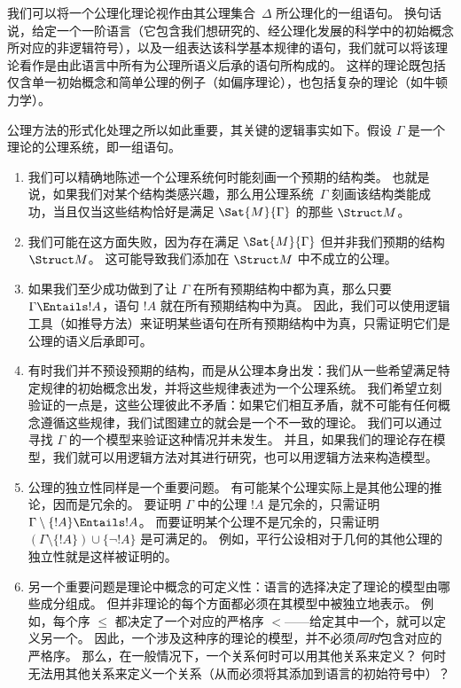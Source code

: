 \documentclass[../../../include/open-logic-section]{subfiles}
\begin{document}
\begin{explain}
我们可以将一个公理化理论视作由其公理集合~$\Delta$ 所公理化的一组语句。
换句话说，给定一个一阶语言（它包含我们想研究的、经公理化发展的科学中的初始概念所对应的非逻辑符号），以及一组表达该科学基本规律的语句，我们就可以将该理论看作是由此语言中所有为公理所语义后承的语句所构成的。
这样的理论既包括仅含单一初始概念和简单公理的例子（如偏序理论），也包括复杂的理论（如牛顿力学）。

公理方法的形式化处理之所以如此重要，其关键的逻辑事实如下。假设 $\Gamma$ 是一个理论的公理系统，即一组语句。
\begin{enumerate}
\item 我们可以精确地陈述一个公理系统何时能刻画一个预期的结构类。
也就是说，如果我们对某个结构类感兴趣，那么用公理系统~$\Gamma$ 刻画该结构类能成功，当且仅当这些结构恰好是满足 $\Sat{M}{\Gamma}$ 的那些 $\Struct M$。
\item 我们可能在这方面失败，因为存在满足 $\Sat{M}{\Gamma}$ 但并非我们预期的结构 $\Struct M$。
这可能导致我们添加在 $\Struct M$ 中不成立的公理。
\item 如果我们至少成功做到了让 $\Gamma$ 在所有预期结构中都为真，那么只要 $\Gamma \Entails !A$，语句 $!A$ 就在所有预期结构中为真。
因此，我们可以使用逻辑工具（如推导方法）来证明某些语句在所有预期结构中为真，只需证明它们是公理的语义后承即可。
\item 有时我们并不预设预期的结构，而是从公理本身出发：我们从一些希望满足特定规律的初始概念出发，并将这些规律表述为一个公理系统。
我们希望立刻验证的一点是，这些公理彼此不矛盾：如果它们相互矛盾，就不可能有任何概念遵循这些规律，我们试图建立的就会是一个不一致的理论。
我们可以通过寻找 $\Gamma$ 的一个模型来验证这种情况并未发生。
并且，如果我们的理论存在模型，我们就可以用逻辑方法对其进行研究，也可以用逻辑方法来构造模型。
\item 公理的独立性同样是一个重要问题。
有可能某个公理实际上是其他公理的推论，因而是冗余的。
要证明 $\Gamma$ 中的公理 $!A$ 是冗余的，只需证明 $\Gamma \setminus
  \{!A\} \Entails !A$。
而要证明某个公理不是冗余的，只需证明 $(\Gamma \setminus \{!A\}) \cup \{\lnot
  !A\}$ 是可满足的。
例如，平行公设相对于几何的其他公理的独立性就是这样被证明的。
\item 另一个重要问题是理论中概念的可定义性：语言的选择决定了理论的模型由哪些成分组成。
但并非理论的每个方面都必须在其模型中被独立地表示。
例如，每个序 $\le$ 都决定了一个对应的严格序 $<$——给定其中一个，就可以定义另一个。
因此，一个涉及这种序的理论的模型，并不必须\emph{同时}包含对应的严格序。
那么，在一般情况下，一个关系何时可以用其他关系来定义？
何时无法用其他关系来定义一个关系（从而必须将其添加到语言的初始符号中）？
\end{enumerate}
\end{explain}
\end{document}
